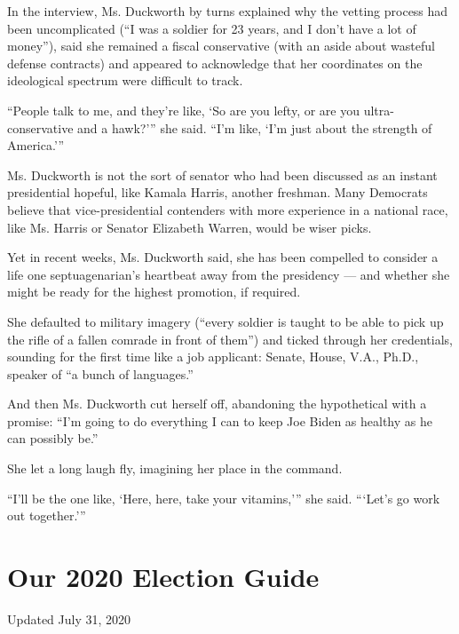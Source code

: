 In the interview, Ms. Duckworth by turns explained why the vetting
process had been uncomplicated (``I was a soldier for 23 years, and I
don't have a lot of money''), said she remained a fiscal conservative
(with an aside about wasteful defense contracts) and appeared to
acknowledge that her coordinates on the ideological spectrum were
difficult to track.

``People talk to me, and they're like, `So are you lefty, or are you
ultra-conservative and a hawk?''' she said. ``I'm like, `I'm just about
the strength of America.'''

Ms. Duckworth is not the sort of senator who had been discussed as an
instant presidential hopeful, like Kamala Harris, another freshman. Many
Democrats believe that vice-presidential contenders with more experience
in a national race, like Ms. Harris or Senator Elizabeth Warren, would
be wiser picks.

Yet in recent weeks, Ms. Duckworth said, she has been compelled to
consider a life one septuagenarian's heartbeat away from the presidency
--- and whether she might be ready for the highest promotion, if
required.

She defaulted to military imagery (``every soldier is taught to be able
to pick up the rifle of a fallen comrade in front of them'') and ticked
through her credentials, sounding for the first time like a job
applicant: Senate, House, V.A., Ph.D., speaker of ``a bunch of
languages.''

And then Ms. Duckworth cut herself off, abandoning the hypothetical with
a promise: ``I'm going to do everything I can to keep Joe Biden as
healthy as he can possibly be.''

She let a long laugh fly, imagining her place in the command.

``I'll be the one like, `Here, here, take your vitamins,''' she said.
```Let's go work out together.'''

\hypertarget{our-2020-election-guide}{%
\section{Our 2020 Election Guide}\label{our-2020-election-guide}}

Updated July 31, 2020

